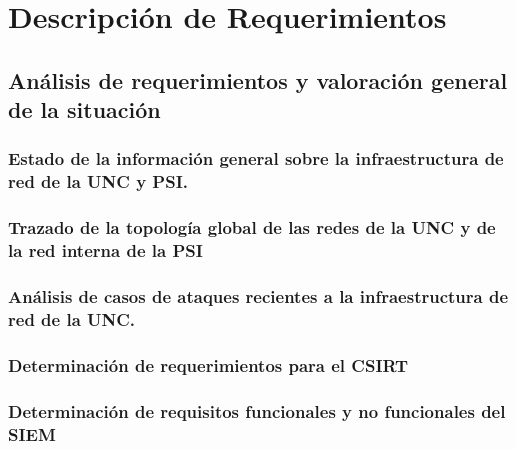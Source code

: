 \chapter{Descripción de Requerimientos}
    \section{Análisis de requerimientos y valoración general de la situación}
        \subsection{Estado de la información general sobre la infraestructura de red de la UNC y PSI.}
        \subsection{Trazado de la topología global de las redes de la UNC y de la red interna de la PSI}
        \subsection{Análisis de casos de ataques recientes a la infraestructura de red de la UNC.}
        \subsection{Determinación de requerimientos para el CSIRT}
        \subsection{Determinación de requisitos funcionales y no funcionales del SIEM}